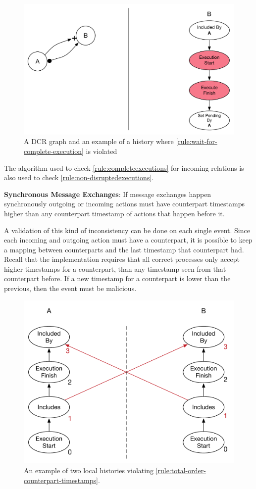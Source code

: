 	\begin{figure}[H]
		\centering
		\includegraphics[width=.7\textwidth]{6validation/images/wait-for-complete-execution.pdf}
		\caption{A DCR graph and an example of a history where \autoref{rule:wait-for-complete-execution} is violated}
		\label{fig:validation:wait-for-complete-execution}
	\end{figure}
	
	\noindent The algorithm used to check \autoref{rule:completeexecutions} for incoming relations is also used to check \autoref{rule:non-disruptedexecutions}.
		
	\begin{ruledef}
		\textbf{Synchronous Message Exchanges}: If message exchanges happen synchronously outgoing or incoming actions must have counterpart timestamps higher than any counterpart timestamp of actions that happen before it.
		\label{rule:total-order-counterpart-timestamps}
	\end{ruledef}
	
	\noindent A validation of this kind of inconsistency can be done on each single event. Since each incoming and outgoing action must have a counterpart, it is possible to keep a mapping between counterparts and the last timestamp that counterpart had. Recall that the implementation requires that all correct processes only accept higher timestamps for a counterpart, than any timestamp seen from that counterpart before. If a new timestamp for a counterpart is lower than the previous, then the event must be malicious.
	
	\begin{figure}[H]
		\centering
		\includegraphics[width=.5\textwidth]{6validation/images/total-order-of-counterpart-timestamps-cycle.pdf}
		\caption{An example of two local histories violating \autoref{rule:total-order-counterpart-timestamps}.}
		\label{fig:validation:total-order-of-counterpart-timestamps}
	\end{figure}
	
